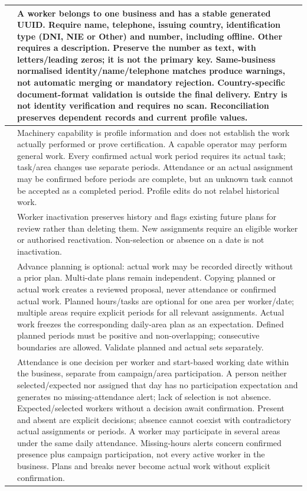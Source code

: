 {\begin{longtable}{L{0.12}L{0.88}}
\midrule
{}\label{br:014}\textbf{} & A worker belongs to one business and has a stable generated UUID. Require name, telephone, issuing country, identification type (DNI, NIE or Other) and number, including offline. Other requires a description. Preserve the number as text, with letters/leading zeros; it is not the primary key. Same-business normalised identity/name/telephone matches produce warnings, not automatic merging or mandatory rejection. Country-specific document-format validation is outside the final delivery. Entry is not identity verification and requires no scan. Reconciliation preserves dependent records and current profile values. \\
\midrule
{}\label{br:015}\textbf{} & Machinery capability is profile information and does not establish the work actually performed or prove certification. A capable operator may perform general work. Every confirmed actual work period requires its actual task; task/area changes use separate periods. Attendance or an actual assignment may be confirmed before periods are complete, but an unknown task cannot be accepted as a completed period. Profile edits do not relabel historical work. \\

\midrule
{}\label{br:016}\textbf{} & Worker inactivation preserves history and flags existing future plans for review rather than deleting them. New assignments require an eligible worker or authorised reactivation. Non-selection or absence on a date is not inactivation. \\
\midrule
{}\label{br:017}\textbf{} & Advance planning is optional: actual work may be recorded directly without a prior plan. Multi-date plans remain independent. Copying planned or actual work creates a reviewed proposal, never attendance or confirmed actual work. Planned hours/tasks are optional for one area per worker/date; multiple areas require explicit periods for all relevant assignments. Actual work freezes the corresponding daily-area plan as an expectation. Defined planned periods must be positive and non-overlapping; consecutive boundaries are allowed. Validate planned and actual sets separately. \\

\midrule
{}\label{br:018}\textbf{} & Attendance is one decision per worker and start-based working date within the business, separate from campaign/area participation. A person neither selected/expected nor assigned that day has no participation expectation and generates no missing-attendance alert; lack of selection is not absence. Expected/selected workers without a decision await confirmation. Present and absent are explicit decisions; absence cannot coexist with contradictory actual assignments or periods. A worker may participate in several areas under the same daily attendance. Missing-hours alerts concern confirmed presence plus campaign participation, not every active worker in the business. Plans and breaks never become actual work without explicit confirmation. \\


\end{longtable}}
